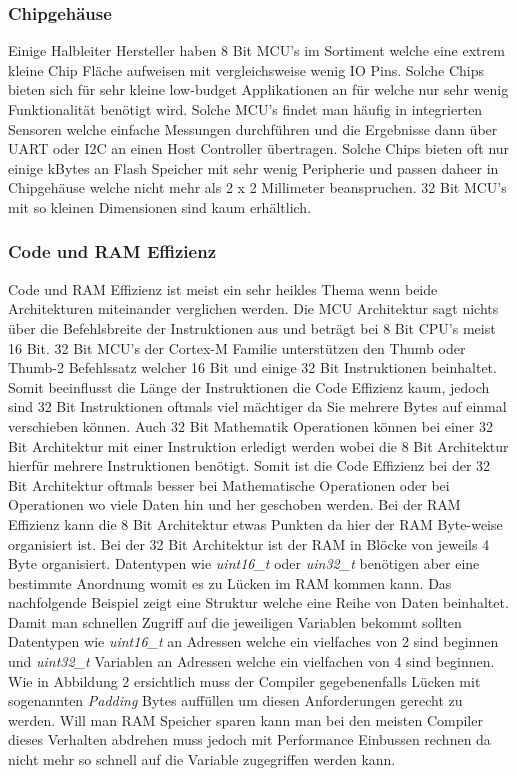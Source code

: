 \documentclass[MES,Master,ngerman]{twbook}%
\begin{document}
\subsubsection{Chipgehäuse}
Einige Halbleiter Hersteller haben 8 Bit MCU's im Sortiment welche eine extrem kleine Chip Fläche aufweisen mit vergleichsweise wenig IO Pins. Solche Chips bieten sich für sehr kleine low-budget Applikationen an für welche nur sehr wenig Funktionalität benötigt wird. Solche MCU's findet man häufig in integrierten Sensoren welche einfache Messungen durchführen und die Ergebnisse dann über UART oder I2C an einen Host Controller übertragen. Solche Chips bieten oft nur einige kBytes an Flash Speicher mit sehr wenig Peripherie und passen daheer in Chipgehäuse welche nicht mehr als 2 x 2 Millimeter beanspruchen. 32 Bit MCU's mit so kleinen Dimensionen sind kaum erhältlich. 
\subsubsection{Code und RAM Effizienz}
Code und RAM Effizienz ist meist ein sehr heikles Thema wenn beide Architekturen miteinander verglichen werden. Die MCU Architektur sagt nichts über die Befehlsbreite der Instruktionen aus und beträgt bei 8 Bit CPU's meist 16 Bit. 32 Bit MCU's der Cortex-M Familie unterstützen den Thumb oder Thumb-2 Befehlssatz welcher 16 Bit und einige 32 Bit Instruktionen beinhaltet. Somit beeinflusst die Länge der Instruktionen die Code Effizienz kaum, jedoch sind 32 Bit Instruktionen oftmals viel mächtiger da Sie mehrere Bytes auf einmal verschieben können. Auch 32 Bit Mathematik Operationen können bei einer 32 Bit Architektur mit einer Instruktion erledigt werden wobei die 8 Bit Architektur hierfür mehrere Instruktionen benötigt. Somit ist die Code Effizienz bei der 32 Bit Architektur oftmals besser bei Mathematische Operationen oder bei Operationen wo viele Daten hin und her geschoben werden. \newline
Bei der RAM Effizienz kann die 8 Bit Architektur etwas Punkten da hier der RAM Byte-weise organisiert ist. Bei der 32 Bit Architektur ist der RAM in Blöcke von jeweils 4 Byte organisiert. Datentypen wie \textit{uint16\_t} oder \textit{uin32\_t} benötigen aber eine bestimmte Anordnung womit es zu Lücken im RAM kommen kann. Das nachfolgende Beispiel zeigt eine Struktur welche eine Reihe von Daten beinhaltet. Damit man schnellen Zugriff auf die jeweiligen Variablen bekommt sollten Datentypen wie \textit{uint16\_t} an Adressen welche ein vielfaches von 2 sind beginnen und \textit{uint32\_t} Variablen an Adressen welche ein vielfachen von 4 sind beginnen. Wie in Abbildung 2 ersichtlich muss der Compiler gegebenenfalls Lücken mit sogenannten \textit{Padding} Bytes auffüllen um diesen Anforderungen gerecht zu werden. Will man RAM Speicher sparen kann man bei den meisten Compiler dieses Verhalten abdrehen muss jedoch mit Performance Einbussen rechnen da nicht mehr so schnell auf die Variable zugegriffen werden kann. \cite{8 Bit vs 32 Bit (Silicon labs) } \newline
\end{document}
